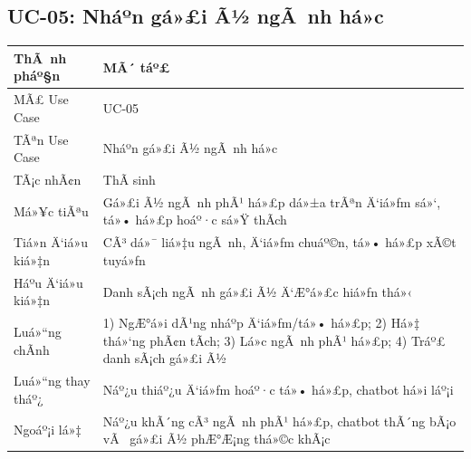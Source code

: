 ﻿\documentclass[12pt,a4paper]{report}
\begin{document}
\subsection{UC-05: Nháº­n gá»£i Ã½ ngÃ nh há»c}
\begin{table}[H]
\centering
\begin{tabular}{|p{3.5cm}|p{8.5cm}|}
\hline
\textbf{ThÃ nh pháº§n} & \textbf{MÃ´ táº£} \\ \hline
MÃ£ Use Case & UC-05 \\ \hline
TÃªn Use Case & Nháº­n gá»£i Ã½ ngÃ nh há»c \\ \hline
TÃ¡c nhÃ¢n & ThÃ­ sinh \\ \hline
Má»¥c tiÃªu & Gá»£i Ã½ ngÃ nh phÃ¹ há»£p dá»±a trÃªn Ä‘iá»ƒm sá»‘, tá»• há»£p hoáº·c sá»Ÿ thÃ­ch \\ \hline
Tiá»n Ä‘iá»u kiá»‡n & CÃ³ dá»¯ liá»‡u ngÃ nh, Ä‘iá»ƒm chuáº©n, tá»• há»£p xÃ©t tuyá»ƒn \\ \hline
Háº­u Ä‘iá»u kiá»‡n & Danh sÃ¡ch ngÃ nh gá»£i Ã½ Ä‘Æ°á»£c hiá»ƒn thá»‹ \\ \hline
Luá»“ng chÃ­nh & 1) NgÆ°á»i dÃ¹ng nháº­p Ä‘iá»ƒm/tá»• há»£p; 2) Há»‡ thá»‘ng phÃ¢n tÃ­ch; 3) Lá»c ngÃ nh phÃ¹ há»£p; 4) Tráº£ danh sÃ¡ch gá»£i Ã½ \\ \hline
Luá»“ng thay tháº¿ & Náº¿u thiáº¿u Ä‘iá»ƒm hoáº·c tá»• há»£p, chatbot há»i láº¡i \\ \hline
Ngoáº¡i lá»‡ & Náº¿u khÃ´ng cÃ³ ngÃ nh phÃ¹ há»£p, chatbot thÃ´ng bÃ¡o vÃ  gá»£i Ã½ phÆ°Æ¡ng thá»©c khÃ¡c \\ \hline
\end{tabular}
\end{table}
\end{document}

